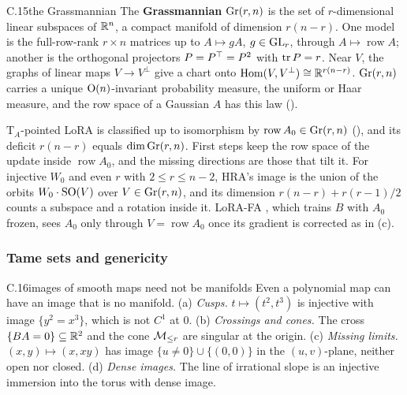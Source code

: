 
\begin{bgentry}{C.15}{the Grassmannian}
The \textbf{Grassmannian} $\operatorname{Gr}(r,n)$ is the set of $r$-dimensional linear subspaces of $\mathbb{R}^n$, a compact manifold of
dimension $r(n-r)$. One model is the full-row-rank $r\times n$ matrices up to $A\mapsto gA$, $g\in\mathrm{GL}_r$, through
$A\mapsto\operatorname{row}A$; another is the orthogonal projectors $P=P^{\top}=P^2$ with $\operatorname{tr} P=r$. Near $V$, the graphs of
linear maps $V\to V^\perp$ give a chart onto $\operatorname{Hom}(V,V^\perp)\cong\mathbb{R}^{r(n-r)}$. $\operatorname{Gr}(r,n)$ carries a
unique $\mathrm{O}(n)$-invariant probability measure, the uniform or Haar measure, and the row space of a Gaussian $A$ has
this law ().
\end{bgentry}

$\mathrm T_A$-pointed LoRA is classified up to isomorphism by $\operatorname{row}A_0\in\operatorname{Gr}(r,n)$
(), and its deficit $r(n-r)$ equals $\dim\operatorname{Gr}(r,n)$. First steps keep the row space of the update
inside $\operatorname{row}A_0$, and the missing directions are those that tilt it. For injective $W_0$ and even $r$ with
$2\le r\le n-2$, HRA's image is the union of the orbits $W_0\cdot\mathrm{SO}(V)$ over $V\in\operatorname{Gr}(r,n)$, and its dimension
$r(n-r)+r(r-1)/2$ counts a subspace and a rotation inside it. LoRA-FA \citep{zhang2023lora}, which trains $B$ with $A_0$
frozen, sees $A_0$ only through $V=\operatorname{row}A_0$ once its gradient is corrected as in
(c).


\subsubsection*{Tame sets and genericity}

\begin{bgfact}{C.16}{images of smooth maps need not be manifolds}
Even a polynomial map can have an image that is no manifold. (a) \emph{Cusps.} $t\mapsto(t^2,t^3)$ is injective with
image $\{y^2=x^3\}$, which is not $C^1$ at $0$. (b) \emph{Crossings and cones.} The cross $\{BA=0\}\subseteq\mathbb{R}^2$ and
the cone $\mathcal{M}_{\le r}$ are singular at the origin. (c) \emph{Missing limits.} $(x,y)\mapsto(x,xy)$ has image
$\{u\ne0\}\cup\{(0,0)\}$ in the $(u,v)$-plane, neither open nor closed. (d) \emph{Dense images.} The line of irrational
slope is an injective immersion into the torus with dense image.
\end{bgfact}

